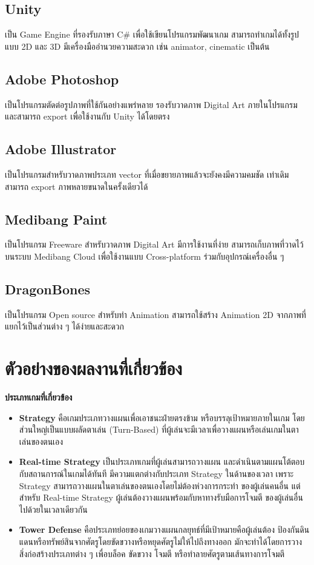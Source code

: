 \documentclass[12pt,oneside,openright,a4paper]{cpe-thai-project}
\begin{document}
\subsection{Unity}
เป็น Game Engine ที่รองรับภาษา C\# เพื่อใช้เขียนโปรแกรมพัฒนาเกม  
สามารถทำเกมได้ทั้งรูปแบบ 2D และ 3D มีเครื่องมืออำนวยความสะดวก 
เช่น animator, cinematic เป็นต้น

\subsection{Adobe Photoshop}
เป็นโปรแกรมตัดต่อรูปภาพที่ใช้กันอย่างแพร่หลาย รองรับวาดภาพ Digital Art 
ภายในโปรแกรม และสามารถ export เพื่อใช้งานกับ Unity ได้โดยตรง
 
\subsection{Adobe Illustrator}
เป็นโปรแกรมสำหรับวาดภาพประเภท vector ที่เมื่อขยายภาพแล้วจะยังคงมีความคมชัด
เท่าเดิม สามารถ export ภาพหลายขนาดในครั้งเดียวได้
 
\subsection{Medibang Paint} 
เป็นโปรแกรม Freeware สำหรับวาดภาพ Digital Art มีการใช้งานที่ง่าย 
สามารถเก็บภาพที่วาดไว้บนระบบ Medibang Cloud เพื่อใช้งานแบบ Cross-platform 
ร่วมกับอุปกรณ์เครื่องอื่น ๆ

\subsection{DragonBones} 
เป็นโปรแกรม Open source สำหรับทำ Animation 
สามารถใช้สร้าง Animation 2D จากภาพที่แยกไว้เป็นส่วนต่าง ๆ ได้ง่ายและสะดวก


\pagebreak
\section{ตัวอย่างของผลงานที่เกี่ยวข้อง}
\textbf{ประเภทเกมที่เกี่ยวข้อง}
\begin{itemize}
  \item \textbf{Strategy} คือเกมประเภทวางแผนเพื่อเอาชนะฝ่ายตรงข้าม 
  หรือบรรลุเป้าหมายภายในเกม โดยส่วนใหญ่เป็นแบบผลัดตาเล่น (Turn-Based) 
  ที่ผู้เล่นจะมีเวลาเพื่อวางแผนหรือเล่นเกมในตาเล่นของตนเอง
  \item \textbf{Real-time Strategy} เป็นประเภทเกมที่ผู้เล่นสามารถวางแผน
  และดำเนินตามแผนโต้ตอบกับสถานการณ์ในเกมได้ทันที มีความแตกต่างกับประเภท Strategy 
  ในด้านของเวลา เพราะ Strategy สามารถวางแผนในตาเล่นของตนเองโดยไม่ต้องห่วงการกระทำ
  ของผู้เล่นคนอื่น แต่สำหรับ Real-time Strategy ผู้เล่นต้องวางแผนพร้อมกับหาทางรับมือการโจมตี
  ของผู้เล่นอื่นไปด้วยในเวลาเดียวกัน
  \item \textbf{Tower Defense} คือประเภทย่อยของเกมวางแผนกลยุทธ์ที่มีเป้าหมายคือผู้เล่นต้อง
  ป้องกันดินแดนหรือทรัพย์สินจากศัตรูโดยขัดขวางหรือหยุดศัตรูไม่ให้ไปถึงทางออก 
  มักจะทำได้โดยการวางสิ่งก่อสร้างประเภทต่าง ๆ เพื่อบล็อค ขัดขวาง โจมตี 
  หรือทำลายศัตรูตามเส้นทางการโจมตี
\end{itemize}
\end{document}
